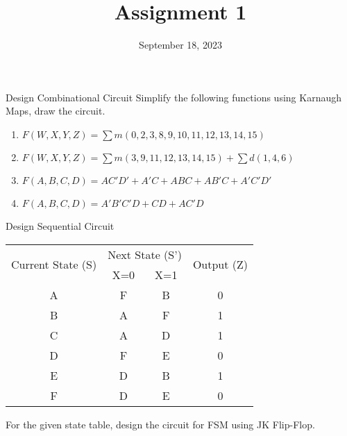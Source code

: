 \documentclass{vhdl-assignment}
\title{Assignment 1}
\date{September 18, 2023}
\begin{document}
\maketitle
\thispagestyle{fancy}

\begin{problem}{Design Combinational Circuit}
    Simplify the following functions using Karnaugh Maps, draw the circuit.
    \begin{enumerate}
        \item$F(W,X,Y,Z)=\sum m(0,2,3,8,9,10,11,12,13,14,15)$
        \item$F(W,X,Y,Z)=\sum m(3,9,11,12,13,14,15) + \sum d(1,4,6)$
        \item$F(A,B,C,D)=AC'D'+A'C+ABC+AB'C+A'C'D'$
        \item$F(A,B,C,D)=A'B'C'D+CD+AC'D$
    \end{enumerate}
\end{problem}

\begin{problem}{Design Sequential Circuit}
    \begin{center}
        \begin{tabular}{|c|cc|c|}
            \hline
            \multirow{2}{*}{Current State (S)} & \multicolumn{2}{c|}{Next State (S')} & \multirow{2}{*}{Output (Z)}     \\ \cline{2-3}
                                               & \multicolumn{1}{c|}{X=0}             & X=1                         &   \\ \hline
            A                                  & \multicolumn{1}{c|}{F  }             & B                           & 0 \\ \hline
            B                                  & \multicolumn{1}{c|}{A  }             & F                           & 1 \\ \hline
            C                                  & \multicolumn{1}{c|}{A  }             & D                           & 1 \\ \hline
            D                                  & \multicolumn{1}{c|}{F  }             & E                           & 0 \\ \hline
            E                                  & \multicolumn{1}{c|}{D  }             & B                           & 1 \\ \hline
            F                                  & \multicolumn{1}{c|}{D  }             & E                           & 0 \\ \hline
        \end{tabular}
    \end{center}
    
    For the given state table, design the circuit for FSM using JK Flip-Flop.
\end{problem}
\end{document}
